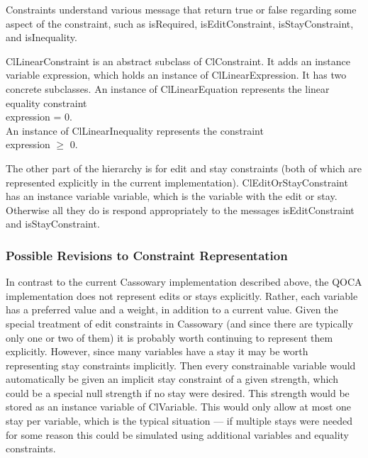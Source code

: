 \documentclass{article}
\begin{document}
Constraints understand various message that return true or false regarding
some aspect of the constraint, such as {\sf isRequired}, {\sf
isEditConstraint}, {\sf isStayConstraint}, and {\sf isInequality}.

{\sf ClLinearConstraint} is an abstract subclass of {\sf ClConstraint}.  It
adds an instance variable {\sf expression}, which holds an instance of
{\sf ClLinearExpression}.  It has two concrete subclasses.  An instance of
{\sf ClLinearEquation} represents the linear equality constraint  \\
\hspace*{1cm} {\sf expression = 0}. \\
An instance of {\sf  ClLinearInequality} represents
the constraint \\
\hspace*{1cm} {\sf expression} $\geq$ 0.

The other part of the hierarchy is for edit and stay constraints (both of
which are represented explicitly in the current implementation).  {\sf
ClEditOrStayConstraint} has an instance variable {\sf variable}, which is
the variable with the edit or stay.  Otherwise all they do is respond
appropriately to the messages {\sf isEditConstraint} and {\sf
isStayConstraint}. 

\subsubsection{Possible Revisions to Constraint Representation}
\label{constraint-revisions}

In contrast to the current Cassowary implementation described above, the
QOCA implementation does not represent edits or stays explicitly.  Rather,
each variable has a preferred value and a weight, in addition to a current
value.  Given the special treatment of edit constraints in Cassowary (and
since there are typically only one or two of them) it is probably worth
continuing to represent them explicitly.  However, since many variables
have a stay it may be worth representing stay constraints implicitly.  Then
every constrainable variable would automatically be given an implicit stay
constraint of a given strength, which could be a special null strength if
no stay were desired.  This strength would be stored as an instance
variable of {\sf ClVariable}.  This would only allow at most one stay per
variable, which is the typical situation --- if multiple stays were needed
for some reason this could be simulated using additional variables and
equality constraints.
\end{document}
